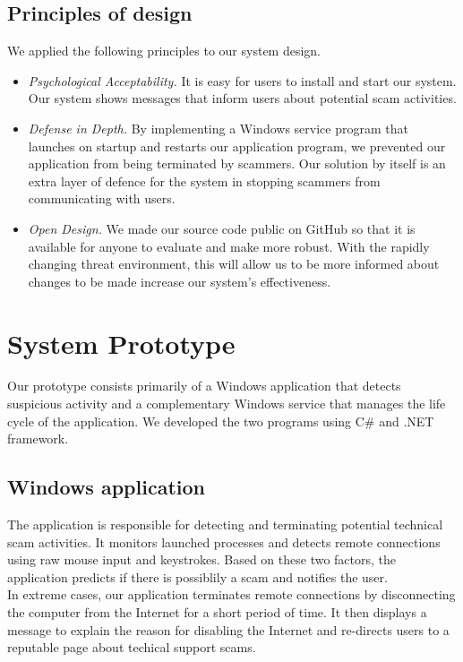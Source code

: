 \documentclass[final]{IEEEtran}
\begin{document}
\subsection{Principles of design}
We applied the following principles to our system design.
\begin{itemize}
  \item\textit{ Psychological Acceptability.} It is easy for users to install and start our system. Our system shows messages that inform users about potential scam activities. 
  \item\textit{ Defense in Depth.} By implementing a Windows service program that launches on startup and restarts our application program, we prevented our application from being terminated by scammers. Our solution by itself is an extra layer of defence for the system in stopping scammers from communicating with users.
  \item\textit{ Open Design.} We made our source code public on GitHub so that it is available for anyone to evaluate and make more robust. With the rapidly changing threat environment, this will allow us to be more informed about changes to be made increase our system's effectiveness.
\end{itemize}

\section{System Prototype} %
Our prototype consists primarily of a Windows application that detects suspicious activity and a complementary Windows service that manages the life cycle of the application. We developed the two programs using C\# and .NET framework. 

\subsection{Windows application}
The application is responsible for detecting and terminating potential technical scam activities. It monitors launched processes and detects remote connections using raw mouse input and keystrokes. Based on these two factors, the application predicts if there is possiblily a scam and notifies the user.\\
In extreme cases, our application terminates remote connections by disconnecting the computer from the Internet for a short period of time. It then displays a message to explain the reason for disabling the Internet and re-directs users to a reputable page about techical support scams.
\end{document}
